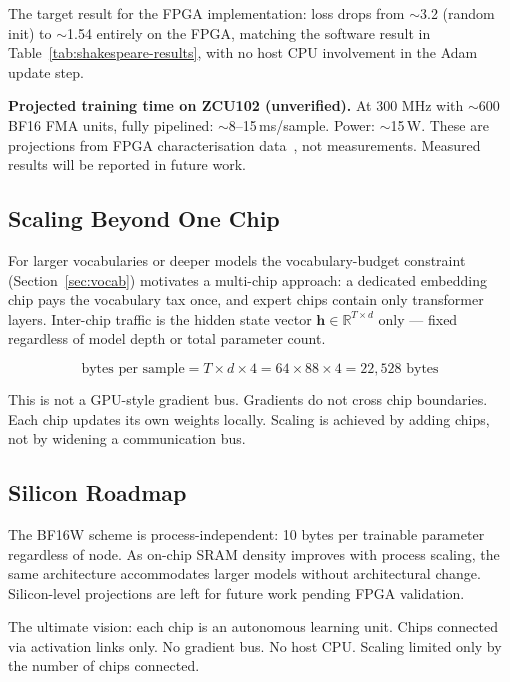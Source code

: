 \documentclass[11pt]{article}
\begin{document}
The target result for the FPGA implementation: loss drops from $\sim$3.2 (random init) to $\sim$1.54
entirely on the FPGA, matching the software result in Table~\ref{tab:shakespeare-results},
with no host CPU involvement in the Adam update step.

\textbf{Projected training time on ZCU102 (unverified).} At 300 MHz with $\sim$600 BF16 FMA units,
fully pipelined: $\sim$8--15\,ms/sample. Power: $\sim$15\,W.
These are projections from FPGA characterisation data~\cite{xilinx_power},
not measurements. Measured results will be reported in future work.

\subsection{Scaling Beyond One Chip}

For larger vocabularies or deeper models the vocabulary-budget constraint
(Section~\ref{sec:vocab}) motivates a multi-chip approach: a dedicated embedding chip
pays the vocabulary tax once, and expert chips contain only transformer layers.
Inter-chip traffic is the hidden state vector $\mathbf{h} \in \mathbb{R}^{T \times d}$
only --- fixed regardless of model depth or total parameter count.

\begin{equation}
\text{bytes per sample} = T \times d \times 4 = 64 \times 88 \times 4 = 22{,}528 \text{ bytes}
\end{equation}

This is not a GPU-style gradient bus. Gradients do not cross chip boundaries.
Each chip updates its own weights locally. Scaling is achieved by adding chips,
not by widening a communication bus.

\subsection{Silicon Roadmap}

The BF16W scheme is process-independent: 10 bytes per trainable parameter regardless of node.
As on-chip SRAM density improves with process scaling, the same architecture accommodates
larger models without architectural change. Silicon-level projections are left for future work
pending FPGA validation.

The ultimate vision: each chip is an autonomous learning unit. Chips connected via activation
links only. No gradient bus. No host CPU. Scaling limited only by the number of chips connected.

\end{document}
